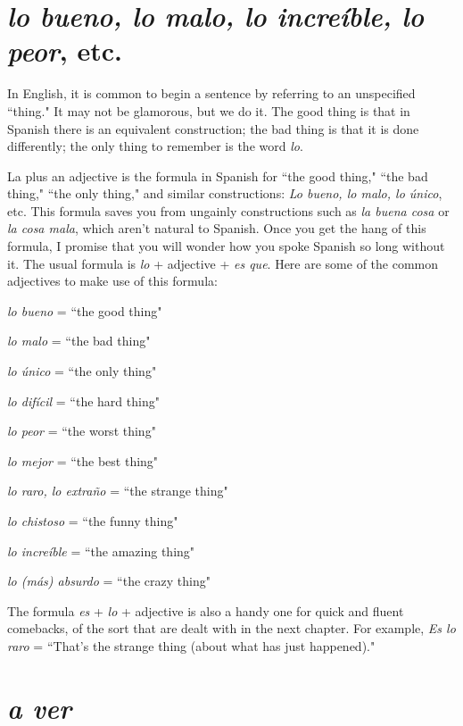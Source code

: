 \section{\emph{lo bueno, lo malo, lo increíble, lo peor}, etc.}

In English, it is common to begin a sentence by referring to an
unspecified ``thing." It may not be glamorous, but we do it. The good
thing is that in Spanish there is an equivalent construction; the bad
thing is that it is done differently; the only thing to remember is the
word \emph{lo}.

La plus an adjective is the formula in Spanish for ``the good
thing," ``the bad thing," ``the only thing," and similar constructions:
\emph{Lo bueno, lo malo, lo único}, etc. This formula saves you from ungainly constructions such as \emph{la buena cosa} or \emph{la cosa mala}, which
aren't natural to Spanish. Once you get the hang of this formula, I
promise that you will wonder how you spoke Spanish so long without
it. The usual formula is \emph{lo} + adjective + \emph{es que}. Here are some of the
common adjectives to make use of this formula:

\bsk

\indu \emph{lo bueno} = ``the good thing"

\indu \emph{lo malo} = ``the bad thing"

\indu \emph{lo único} = ``the only thing"

\indu \emph{lo difícil} = ``the hard thing"

\indu \emph{lo peor} = ``the worst thing"

\indu \emph{lo mejor} = ``the best thing"

\indu \emph{lo raro, lo extraño} = ``the strange thing"

\indu \emph{lo chistoso} = ``the funny thing"

\indu \emph{lo increíble} = ``the amazing thing"

\indu \emph{lo (más) absurdo} = ``the crazy thing"

\bsk

The formula \emph{es} + \emph{lo} + adjective is also a handy one for quick and
fluent comebacks, of the sort that are dealt with in the next chapter.
For example, \emph{Es lo raro} = ``That's the strange thing (about what has
just happened)."

\section{\emph{a ver}}

